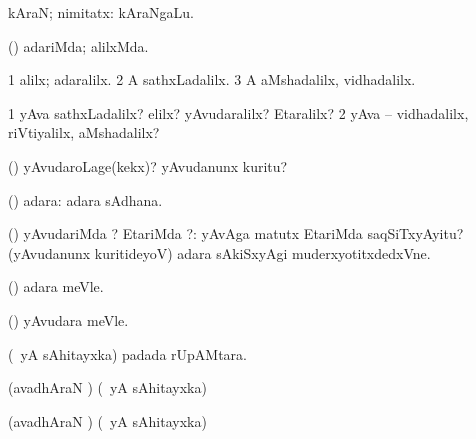 {{{{{{\bentry
{} 
\gl{\nA}
\expl{}
\bmng
kAraN; nimitatx:  kAraNgaLu. 
\emng
\eentry

\bentry
{} 
\gl{\saMavayx}
\expl{}
\bmng
(\pArxparx) adariMda; alilxMda. 
\emng
\eentry

\bentry
{} 
\gl{\saMavayx}
\expl{}
\bmng
\bnum
\num{1} alilx; adaralilx. 
\num{2} A sathxLadalilx. 
\num{3} A aMshadalilx, vidhadalilx. 
\enum
\emng
\eentry

\bentry
{} 
\gl{\kirxvi}
\expl{(\aupa) }
\bmng
\bnum
\num{1} yAva sathxLadalilx? elilx? yAvudaralilx? Etaralilx? 
\num{2} yAva -- vidhadalilx, riVtiyalilx, aMshadalilx? 
\enum
\emng
\eentry

\bentry
{} 
\gl{\kirxvi}
\expl{}
\bmng
(\pArxparx) yAvudaroLage(kekx)? yAvudanunx kuritu? 
\emng
\eentry

\bentry
{} 
\gl{\saMavayx}
\expl{}
\bmng
(\aupa) adara:  adara sAdhana. 
\emng
\eentry

\bentry
{} 
\gl{\kirxvi}
\expl{}
\bmng
(\aupa) yAvudariMda ? EtariMda ?:  yAvAga matutx EtariMda saqSiTxyAyitu?  (yAvudanunx kuritideyoV) adara sAkiSxyAgi muderxyotitxdedxVne. 
\emng
\eentry

\bentry
{} 
\gl{\saMavayx}
\expl{}
\bmng
(\pArxparx) adara meVle. 
\emng
\eentry

\bentry
{} 
\gl{\kirxvi}
\expl{}
\bmng
(\pArxparx) yAvudara meVle. 
\emng
\eentry

\bentry
{} 
\expl{}
\bmng
 (\aupa\ yA sAhitayxka)  padada rUpAMtara. 
\emng
\eentry

\bentry
{} 
\gl{\kirxvi}
\expl{}
\bmng
(avadhAraN \parx) (\aupa\ yA sAhitayxka)  
\emng
\eentry

\bentry
{} 
\gl{\saMavayx}
\expl{}
\bmng
(avadhAraN \parx) (\aupa\ yA sAhitayxka)  
\emng
\eentry

}}}}}}
